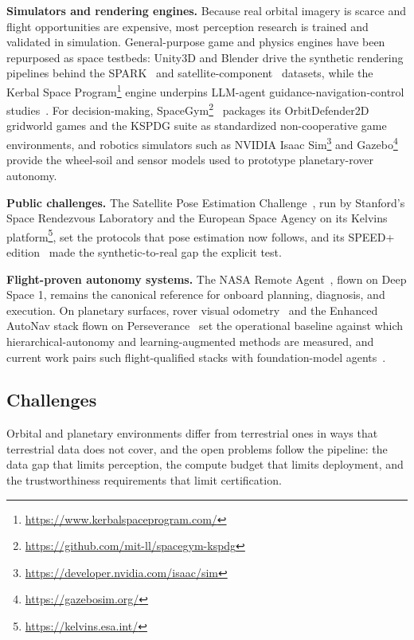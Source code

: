 \textbf{Simulators and rendering engines.}
Because real orbital imagery is scarce and flight opportunities are expensive, most perception research is trained and validated in simulation.
General-purpose game and physics engines have been repurposed as space testbeds: Unity3D and Blender drive the synthetic rendering pipelines behind the SPARK~\cite{musallam2021spacecraft} and satellite-component~\cite{shao2023satellite} datasets, while the Kerbal Space Program\footnote{\url{https://www.kerbalspaceprogram.com/}} engine underpins LLM-agent guidance-navigation-control studies~\cite{carrasco2025llmAutonomousSpacecraft}.
For decision-making, SpaceGym\footnote{\url{https://github.com/mit-ll/spacegym-kspdg}}~\cite{allen2023spacegym} packages its OrbitDefender2D gridworld games and the KSPDG suite as standardized non-cooperative game environments, and robotics simulators such as NVIDIA Isaac Sim\footnote{\url{https://developer.nvidia.com/isaac/sim}} and Gazebo\footnote{\url{https://gazebosim.org/}} provide the wheel-soil and sensor models used to prototype planetary-rover autonomy.

\textbf{Public challenges.}
The Satellite Pose Estimation Challenge~\cite{kisantal2020satellitechallenge}, run by Stanford's Space Rendezvous Laboratory and the European Space Agency on its Kelvins platform\footnote{\url{https://kelvins.esa.int/}}, set the protocols that pose estimation now follows, and its SPEED+ edition~\cite{park2022speed+} made the synthetic-to-real gap the explicit test.

\textbf{Flight-proven autonomy systems.}
The NASA Remote Agent~\cite{bernard1998designremoteagent}, flown on Deep Space 1, remains the canonical reference for onboard planning, diagnosis, and execution.
On planetary surfaces, rover visual odometry~\cite{maimone2007two} and the Enhanced AutoNav stack flown on Perseverance~\cite{toupet2025enav} set the operational baseline against which hierarchical-autonomy and learning-augmented methods are measured, and current work pairs such flight-qualified stacks with foundation-model agents~\cite{wu2025spacemind}.


\subsection{Challenges}
\label{subsec:p4-sec11-3-challenges}
Orbital and planetary environments differ from terrestrial ones in ways that terrestrial data does not cover, and the open problems follow the pipeline: the data gap that limits perception, the compute budget that limits deployment, and the trustworthiness requirements that limit certification.

